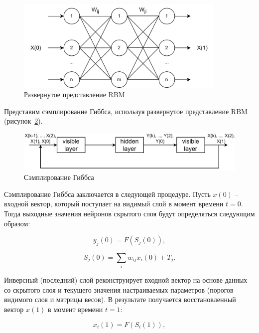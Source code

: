 \begin{figure}[H]
  \centering
  \includegraphics[width=0.9\textwidth]{man-source/images/ch2/pic2-1.png}
  \caption{Развернутое представление RBM}
  \label{fig:pic2_1}
\end{figure}

Представим сэмплирование Гиббса, используя развернутое представление RBM (рисунок~\ref{fig:pic2_2}).

\begin{figure}[H]
  \centering
  \includegraphics[width=\textwidth]{man-source/images/ch2/pic2-2.png}
  \caption{Сэмплирование Гиббса}
  \label{fig:pic2_2}
\end{figure}

Сэмплирование Гиббса заключается в следующей процедуре. Пусть $x(0)$ -- входной вектор, который поступает на видимый слой в момент времени $t=0$. Тогда выходные значения нейронов скрытого слоя будут определяться следующим образом:

\begin{equation}
    y_j(0)=F(S_j(0)),
\end{equation}

\begin{equation}
    S_j(0)=\sum_i w_{ij}x_i(0)+T_j.
\end{equation}

Инверсный (последний) слой  реконструирует входной вектор на основе данных со скрытого слоя и текущего значения настраиваемых параметров (порогов видимого слоя и матрицы весов). В результате получается восстановленный вектор $x(1)$ в момент времени $t=1$:

\begin{equation}
    x_i(1)=F(S_i(1)),
\end{equation}

